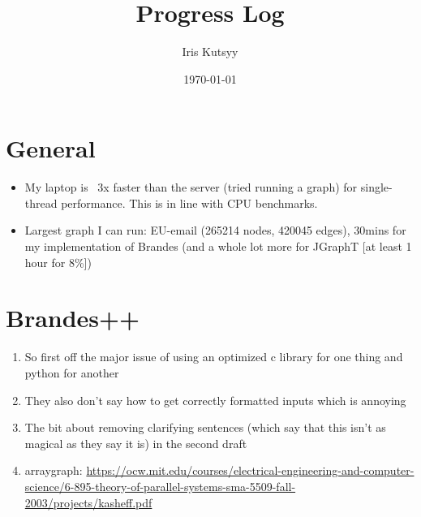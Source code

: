 \documentclass[a4paper,12pt,english]{article}
\begin{document}
\title{Progress Log}
\author{Iris Kutsyy}
\date{\protect\today}

\maketitle
\frenchspacing
\section*{General}
\begin{itemize}
\item My laptop is ~3x faster than the server (tried running a graph) for single-thread performance. This is in line with CPU benchmarks.
\item Largest graph I can run: EU-email (265214 nodes, 420045 edges), 30mins for my implementation of Brandes (and a whole lot more for JGraphT [at least 1 hour for 8\%])
\end{itemize}
\section*{Brandes++}
\begin{enumerate}
\item So first off the major issue of using an optimized c library for one thing and python for another
\item They also don't say how to get correctly formatted inputs which is annoying 
\item The bit about removing clarifying sentences (which say that this isn't as magical as they say it is)
 in the second draft
 \item arraygraph: \url{https://ocw.mit.edu/courses/electrical-engineering-and-computer-science/6-895-theory-of-parallel-systems-sma-5509-fall-2003/projects/kasheff.pdf}
\end{enumerate}
\end{document}
